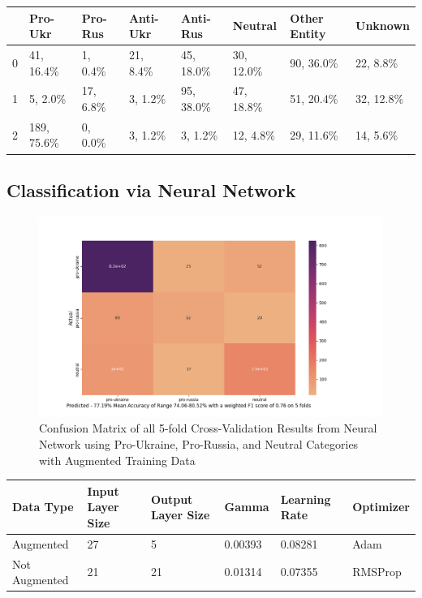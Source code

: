 \documentclass[12pt,letterpaper,oneside,titlepage]{article}
\begin{document}
\begin{center}
\begin{tabular}{llllllll}
\toprule
	{} &  Pro-Ukr & Pro-Rus & Anti-Ukr & Anti-Rus &     Neutral & Other Entity &     Unknown \\
	\midrule
    0 &   41, 16.4\% &   1, 0.4\% &    21, 8.4\% &  45, 18.0\% &  30, 12.0\% &   90, 36.0\% &   22, 8.8\% \\
    1 &     5, 2.0\% &  17, 6.8\% &     3, 1.2\% &  95, 38.0\% &  47, 18.8\% &   51, 20.4\% &  32, 12.8\% \\
    2 &  189, 75.6\% &   0, 0.0\% &     3, 1.2\% &    3, 1.2\% &   12, 4.8\% &   29, 11.6\% &   14, 5.6\% \\
	\bottomrule
	\end{tabular}
    \captionsetup{justification=centering}
    \label{kmeanstable}
\end{center}

\subsection{Classification via Neural Network}\label{subsec:classification-via-nn}

\begin{figure}[ht]
    \centering
    \includegraphics[scale=0.6]{nn-cv-3-augmented}
    \captionsetup{justification=centering}
    \caption{Confusion Matrix of all 5-fold Cross-Validation Results from Neural Network using Pro-Ukraine, Pro-Russia, and Neutral Categories with Augmented Training Data}
\end{figure}
\FloatBarrier

\begin{center}
\begin{tabular}{llllll}
\toprule
	Data Type & Input Layer Size & Output Layer Size & Gamma & Learning Rate & Optimizer \\
	\midrule
    Augmented & 27 & 5 & 0.00393 & 0.08281 & Adam \\
    Not Augmented & 21 & 21 & 0.01314 & 0.07355 & RMSProp \\
	\bottomrule
	\end{tabular}
    \captionsetup{justification=centering}
    \label{nntable}
\end{center}
\end{document}
